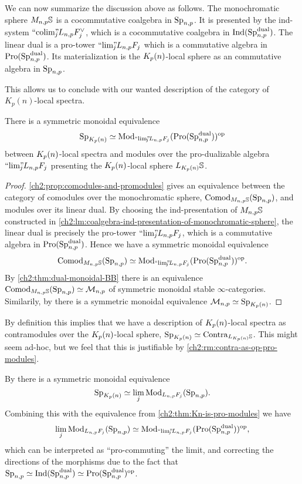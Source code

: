 We can now summarize the discussion above as follows. The monochromatic sphere $M_{n,p}\mathbb{S}$ is a cocommutative coalgebra in $\mathrm{Sp}_{n,p}$. It is presented by the ind-system $``\!\operatorname{colim}\!"_{\hspace{-5pt} j} L_{n,p} F_j^\vee$, which is a cocommutative coalgebra in $\operatorname{Ind}(\mathrm{Sp}_{n,p}^{\mathrm{dual}})$. The linear dual is a pro-tower $``\!\lim\!"_{\hspace{-5pt} j} L_{n,p} F_j$ which is a commutative algebra in $\operatorname{Pro}(\mathrm{Sp}_{n,p}^{\mathrm{dual}})$. Its materialization is the ${K_p(n)}$-local sphere as an commutative algebra in $\mathrm{Sp}_{n,p}$. 

This allows us to conclude with our wanted description of the category of $K_p(n)$-local spectra. 

\begin{theorem}
    \label{ch2:thm:Kn-is-pro-modules}
    There is a symmetric monoidal equivalence 
    \[\mathrm{Sp}_{{K_p(n)}} \simeq \mathrm{Mod}_{``\!\lim\!"_{\hspace{-5pt} j} L_{n,p} F_j}(\operatorname{Pro}(\mathrm{Sp}_{n,p}^{\mathrm{dual}}))^{\mathrm{op}}\]
    between ${K_p(n)}$-local spectra and modules over the pro-dualizable algebra $``\!\lim\!"_{\hspace{-5pt} j} L_{n,p} F_j$ presenting the ${K_p(n)}$-local sphere $L_{K_p(n)}\mathbb{S}$. 
\end{theorem}
\begin{proof}
    \cref{ch2:prop:comodules-and-promodules} gives an equivalence between the category of comodules over the monochromatic sphere, $\mathrm{Comod}_{M_{n,p} \mathbb{S}}(\mathrm{Sp}_{n,p})$, and modules over its linear dual. By choosing the ind-presentation of $M_{n,p} \mathbb{S}$ constructed in \cref{ch2:lm:coalgebra-ind-presentation-of-monochromatic-sphere}, the linear dual is precisely the pro-tower $``\!\lim\!"_{\hspace{-5pt} j} L_{n,p} F_j$, which is a commutative algebra in $\operatorname{Pro}(\mathrm{Sp}_{n,p}^{\mathrm{dual}})$. Hence we have a symmetric monoidal equivalence 
    \[\mathrm{Comod}_{M_{n,p}\mathbb{S}}(\mathrm{Sp}_{n,p})\simeq \mathrm{Mod}_{``\!\lim\!"_{\hspace{-5pt} j} L_{n,p} F_j}(\operatorname{Pro}(\mathrm{Sp}_{n,p}^{\mathrm{dual}}))^{\mathrm{op}}.\]
    By \cref{ch2:thm:dual-monoidal-BB} there is an equivalence $\mathrm{Comod}_{M_{n,p}\mathbb{S}}(\mathrm{Sp}_{n,p})\simeq \mathcal{M}_{n,p}$ of symmetric monoidal stable $\infty$-categories. Similarily, by \cite[6.19]{hovey-strickland_99} there is a symmetric monoidal equivalence $\mathcal{M}_{n,p} \simeq \mathrm{Sp}_{{K_p(n)}}$. 
\end{proof}

\begin{remark}
    By definition this implies that we have a description of ${K_p(n)}$-local spectra as contramodules over the ${K_p(n)}$-local sphere, $\mathrm{Sp}_{{K_p(n)}} \simeq \mathrm{Contra}_{L_{K_p(n)}\mathbb{S}}$. This might seem ad-hoc, but we feel that this is justifiable by \cref{ch2:rm:contra-as-op-pro-modules}.
\end{remark}

\begin{remark}
    By \cite[2.2.1, 2.2.7]{li-zhang_2023} there is a symmetric monoidal equivalence 
    \[\mathrm{Sp}_{K_p(n)} \simeq \lim_j \mathrm{Mod}_{L_{n,p} F_j}(\mathrm{Sp}_{n,p}).\]
    Combining this with the equivalence from \cref{ch2:thm:Kn-is-pro-modules} we have 
    \[\lim_j \mathrm{Mod}_{L_{n,p} F_j}(\mathrm{Sp}_{n,p}) \simeq \mathrm{Mod}_{``\!\lim\!"_{\hspace{-5pt} j} L_{n,p} F_j}(\operatorname{Pro}(\mathrm{Sp}_{n,p}^{\mathrm{dual}}))^{\mathrm{op}},\]
    which can be interpreted as ``pro-commuting'' the limit, and correcting the directions of the morphisms due to the fact that $\mathrm{Sp}_{n,p}\simeq \operatorname{Ind}(\mathrm{Sp}_{n,p}^{\mathrm{dual}}) \simeq \operatorname{Pro}(\mathrm{Sp}_{n,p}^{\mathrm{dual}})^{\mathrm{op}}$. 
\end{remark}

